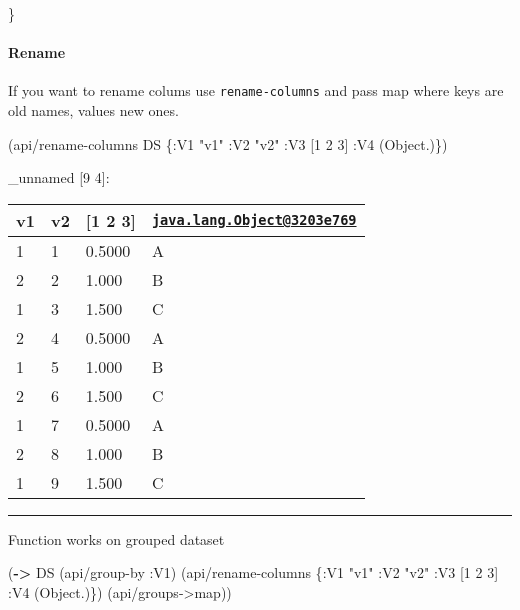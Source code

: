 \documentclass[]{article}
\newenvironment{Shaded}{\begin{snugshade}}{\end{snugshade}}
\newcommand{\KeywordTok}[1]{\textcolor[rgb]{0.13,0.29,0.53}{\textbf{#1}}}
\newcommand{\DecValTok}[1]{\textcolor[rgb]{0.00,0.00,0.81}{#1}}
\newcommand{\StringTok}[1]{\textcolor[rgb]{0.31,0.60,0.02}{#1}}
\newcommand{\AttributeTok}[1]{\textcolor[rgb]{0.77,0.63,0.00}{#1}}
\newcommand{\NormalTok}[1]{#1}
\let\oldparagraph\paragraph
\renewcommand{\paragraph}[1]{\oldparagraph{#1}\mbox{}}
\begin{document}
\}

\paragraph{Rename}\label{rename}

If you want to rename colums use \texttt{rename-columns} and pass map
where keys are old names, values new ones.

\begin{Shaded}
\begin{Highlighting}[]
\NormalTok{(api/rename-columns DS \{}\AttributeTok{:V1} \StringTok{"v1"}
                        \AttributeTok{:V2} \StringTok{"v2"}
                        \AttributeTok{:V3}\NormalTok{ [}\DecValTok{1} \DecValTok{2} \DecValTok{3}\NormalTok{]}
                        \AttributeTok{:V4}\NormalTok{ (Object.)\})}
\end{Highlighting}
\end{Shaded}

\_unnamed {[}9 4{]}:

\begin{longtable}[]{@{}llll@{}}
\toprule
v1 & v2 & {[}1 2 3{]} &
\href{mailto:java.lang.Object@3203e769}{\nolinkurl{java.lang.Object@3203e769}}\tabularnewline
\midrule
\endhead
1 & 1 & 0.5000 & A\tabularnewline
2 & 2 & 1.000 & B\tabularnewline
1 & 3 & 1.500 & C\tabularnewline
2 & 4 & 0.5000 & A\tabularnewline
1 & 5 & 1.000 & B\tabularnewline
2 & 6 & 1.500 & C\tabularnewline
1 & 7 & 0.5000 & A\tabularnewline
2 & 8 & 1.000 & B\tabularnewline
1 & 9 & 1.500 & C\tabularnewline
\bottomrule
\end{longtable}

\begin{center}\rule{0.5\linewidth}{0.5pt}\end{center}

Function works on grouped dataset

\begin{Shaded}
\begin{Highlighting}[]
\NormalTok{(}\KeywordTok{->}\NormalTok{ DS}
\NormalTok{    (api/group-by }\AttributeTok{:V1}\NormalTok{)}
\NormalTok{    (api/rename-columns \{}\AttributeTok{:V1} \StringTok{"v1"}
                         \AttributeTok{:V2} \StringTok{"v2"}
                         \AttributeTok{:V3}\NormalTok{ [}\DecValTok{1} \DecValTok{2} \DecValTok{3}\NormalTok{]}
                         \AttributeTok{:V4}\NormalTok{ (Object.)\})}
\NormalTok{    (api/groups->map))}
\end{Highlighting}
\end{Shaded}
\end{document}
